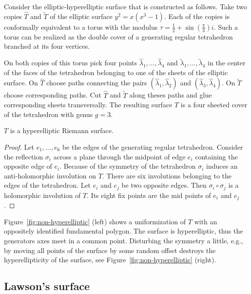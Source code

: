 \documentclass[Thesis]{subfiles}
\begin{document}
Consider the elliptic-hyperelliptic surface that is constructed as follows. Take two copies $\hat T$ and $\tilde T$ of the elliptic surface $y^2=x(x^3 - 1)$. Each of the copies is conformally equivalent to a torus with the modulus $\tau=\frac{1}{2}+\sin(\frac{\pi}{3})i$. Such a torus can be realized as the double cover of a generating regular tetrahedron branched at its four vertices.

On both copies of this torus pick four points $\hat\lambda_1,\ldots,\hat\lambda_4$ and $\tilde\lambda_1,\ldots,\tilde\lambda_4$ in the center of the faces of the tetrahedron belonging to one of the sheets of the elliptic surface. On $\hat T$ choose paths connecting the pairs $(\hat\lambda_1,\hat\lambda_2)$ and $(\hat\lambda_3,\hat\lambda_4)$. On $\tilde T$ choose corresponding paths. Cut $\hat T$ and $\tilde T$ along theses paths and glue corresponding sheets transversally. The resulting surface $T$ is a four sheeted cover of the tetrahedron with genus $g = 3$.

\begin{proposition}
$T$ is a hyperelliptic Riemann surface.
\end{proposition}

\begin{proof}
Let $e_1,\ldots,e_6$ be the edges of the generating regular tetrahedron. Consider the reflection $\sigma_i$ across a plane through the midpoint of edge $e_i$ containing the opposite edge of $e_i$.  Because of the symmetry of the tetrahedron $\sigma_i$ induces an anti-holomorphic involution on $T$. There are six involutions belonging to the edges of the tetrahedron. Let $e_i$ and $e_j$ be two opposite edges. Then $\sigma_i \circ \sigma_j$ is a holomorphic involution of $T$. Its eight fix points are the mid points of $e_i$ and $e_j$.
\end{proof}

Figure~\ref{fig:non-hyperelliptic} (left) shows a uniformization of $T$ with an oppositely identified fundamental polygon. The surface is hyperelliptic, thus the generators axes meet in a common point. Disturbing the symmetry a little, e.g., by moving all points of the surface by some random offset destroys the hyperellipticity of the surface, see Figure~\ref{fig:non-hyperelliptic} (right).

\subsection{Lawson's surface}
\label{sec:lawson_uniformization}
\end{document}
